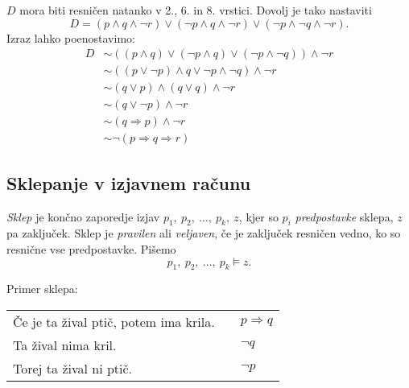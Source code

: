 \documentclass[12pt, a4paper]{article}
\renewcommand{\implies}{\Rightarrow}
\begin{document}
\vspace{1cm}
$D$ mora biti resničen natanko v 2., 6. in 8. vrstici. Dovolj je tako nastaviti
\[
D=(p\land q\land\neg r)\lor(\neg p\land q\land\neg r)\lor(\neg p\land\neg q\land\neg r).
\]
Izraz lahko poenostavimo:
\begin{align*}
D&\sim ((p\land q)\lor(\neg p\land q)\lor (\neg p\land \neg q))\land\neg r
\\
&\sim ((p\lor \neg p)\land q\lor \neg p\land \neg q)\land\neg r
\\
&\sim (q\lor p)\land (q\lor q)\land\neg r
\\
&\sim (q\lor\neg p)\land\neg r
\\
&\sim(q\implies p)\land\neg r
\\
&\sim\neg(p\implies q\implies r)
\end{align*}

\newpage

\subsection{Sklepanje v izjavnem računu}

\begin{okvir}
\begin{definicija}
\emph{Sklep} je končno zaporedje izjav $p_1,~p_2,~\dots,~p_k,~z$, kjer so $p_i$ \emph{predpostavke} sklepa, $z$ pa zaključek. Sklep je \emph{pravilen} ali \emph{veljaven}, če je zaključek resničen vedno, ko so resnične vse predpostavke. Pišemo
\[
p_1,~p_2,~\dots,~p_k \models z.
\]
\end{definicija}
\end{okvir}

\begin{zgled}
Primer sklepa:

\begin{center}
\begin{tabular}{lcl}
Če je ta žival ptič, potem ima krila. && $p\implies q$
\\
Ta žival nima kril. && $\neg q$
\\
\cline{1-1}\cline{3-3}
Torej ta žival ni ptič. && $\neg p$
\end{tabular}
\end{center}
\end{zgled}
\end{document}
